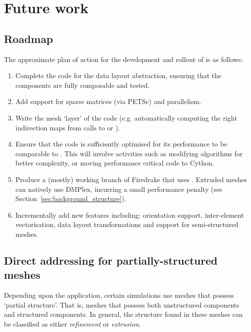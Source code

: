 \section{Future work}
\label{sec:future}

\subsection{Roadmap}
\label{sec:future_roadmap}

The approximate plan of action for the development and rollout of  is as follows:

\begin{enumerate}
  \item
    Complete the code for the data layout abstraction, ensuring that the components are fully composable and tested.
  \item
    Add support for sparse matrices (via PETSc) and parallelism.
  \item
    Write the mesh `layer' of the code (e.g. automatically computing the right indirection maps from calls to  or ).
  \item
    Ensure that the code is sufficiently optimised for its performance to be comparable to .
    This will involve activities such as modifying algorithms for better complexity, or moving performance critical code to Cython.
  \item
    Produce a (mostly) working branch of Firedrake that uses .
    Extruded meshes can natively use DMPlex, incurring a small performance penalty (see Section~\ref{sec:background_structure}).
  \item
    Incrementally add new features including: orientation support, inter-element vectorisation, data layout transformations and support for semi-structured meshes.
\end{enumerate}

\subsection{Direct addressing for partially-structured meshes}
\label{sec:future_partialstructure}

Depending upon the application, certain simulations use meshes that possess `partial structure'.
That is, meshes that possess both unstructured components and structured components.
In general, the structure found in these meshes can be classified as either \textit{refinement} or \textit{extrusion}.

